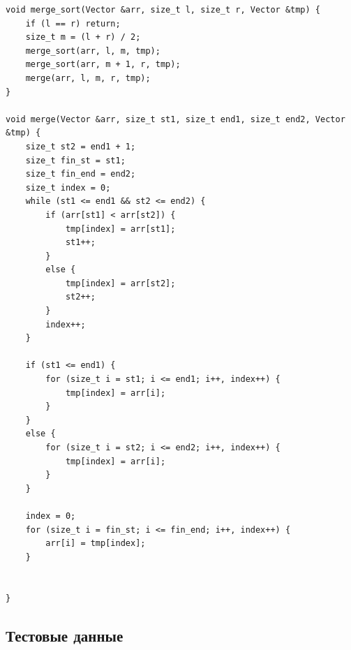 \documentclass[a4paper,12pt]{article}
\begin{document}
	\begin{lstlisting}[label=code_vin_opt, caption={Сортировка слиянием}]
void merge_sort(Vector &arr, size_t l, size_t r, Vector &tmp) {
    if (l == r) return;
    size_t m = (l + r) / 2;
    merge_sort(arr, l, m, tmp);
    merge_sort(arr, m + 1, r, tmp);
    merge(arr, l, m, r, tmp);
}

void merge(Vector &arr, size_t st1, size_t end1, size_t end2, Vector &tmp) {
    size_t st2 = end1 + 1;
    size_t fin_st = st1;
    size_t fin_end = end2;
    size_t index = 0;
    while (st1 <= end1 && st2 <= end2) {
        if (arr[st1] < arr[st2]) {
            tmp[index] = arr[st1];
            st1++;
        }
        else {
            tmp[index] = arr[st2];
            st2++;
        }
        index++;
    }

    if (st1 <= end1) {
        for (size_t i = st1; i <= end1; i++, index++) {
            tmp[index] = arr[i];
        }
    }
    else {
        for (size_t i = st2; i <= end2; i++, index++) {
            tmp[index] = arr[i];
        }
    }

    index = 0;
    for (size_t i = fin_st; i <= fin_end; i++, index++) {
        arr[i] = tmp[index];
    }


}

    \end{lstlisting}  
    
%    
    \subsection{Тестовые данные}
    \label{fig:test_data}
\end{document}
